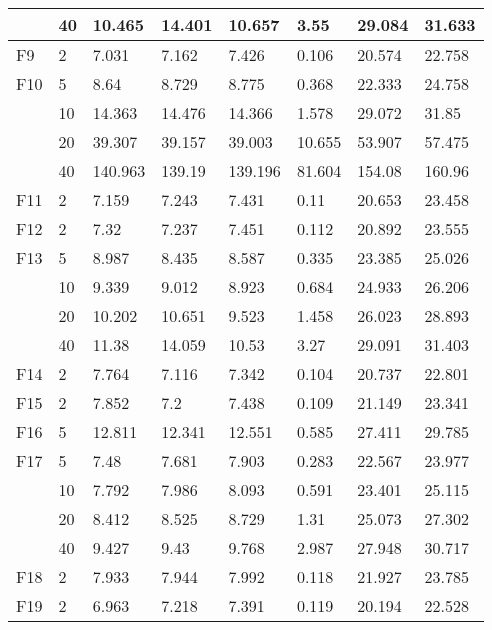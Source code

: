 \begin{longtable}{|l|l|l|l|l|l|l|l|}
            & 40  & 10.465  & 14.401 & 10.657  & 3.55   & 29.084  & 31.633  \\ \midrule
F9       & 2   & 7.031   & 7.162  & 7.426   & 0.106  & 20.574  & 22.758  \\ \midrule
F10      & 5   & 8.64    & 8.729  & 8.775   & 0.368  & 22.333  & 24.758  \\ \cmidrule{2-8}
            & 10  & 14.363  & 14.476 & 14.366  & 1.578  & 29.072  & 31.85   \\ \cmidrule{2-8}
            & 20  & 39.307  & 39.157 & 39.003  & 10.655 & 53.907  & 57.475  \\ \cmidrule{2-8}
            & 40  & 140.963 & 139.19 & 139.196 & 81.604 & 154.08  & 160.96  \\ \midrule
F11      & 2   & 7.159   & 7.243  & 7.431   & 0.11   & 20.653  & 23.458  \\ \midrule
F12      & 2   & 7.32    & 7.237  & 7.451   & 0.112  & 20.892  & 23.555  \\ \midrule
F13      & 5   & 8.987   & 8.435  & 8.587   & 0.335  & 23.385  & 25.026  \\ \cmidrule{2-8}
            & 10  & 9.339   & 9.012  & 8.923   & 0.684  & 24.933  & 26.206  \\ \cmidrule{2-8}
            & 20  & 10.202  & 10.651 & 9.523   & 1.458  & 26.023  & 28.893  \\ \cmidrule{2-8}
            & 40  & 11.38   & 14.059 & 10.53   & 3.27   & 29.091  & 31.403  \\ \midrule
F14      & 2   & 7.764   & 7.116  & 7.342   & 0.104  & 20.737  & 22.801  \\ \midrule
F15      & 2   & 7.852   & 7.2    & 7.438   & 0.109  & 21.149  & 23.341  \\ \midrule
F16      & 5   & 12.811  & 12.341 & 12.551  & 0.585  & 27.411  & 29.785  \\ \midrule
F17      & 5   & 7.48    & 7.681  & 7.903   & 0.283  & 22.567  & 23.977  \\ \cmidrule{2-8}
            & 10  & 7.792   & 7.986  & 8.093   & 0.591  & 23.401  & 25.115  \\ \cmidrule{2-8}
            & 20  & 8.412   & 8.525  & 8.729   & 1.31   & 25.073  & 27.302  \\ \cmidrule{2-8}
            & 40  & 9.427   & 9.43   & 9.768   & 2.987  & 27.948  & 30.717  \\ \midrule
F18      & 2   & 7.933   & 7.944  & 7.992   & 0.118  & 21.927  & 23.785  \\ \midrule
F19      & 2   & 6.963   & 7.218  & 7.391   & 0.119  & 20.194  & 22.528  \\ \midrule

\end{longtable}
